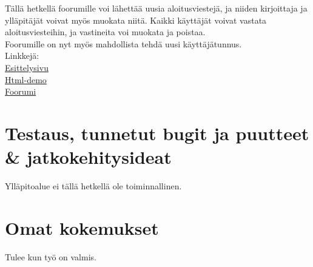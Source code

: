 \documentclass[12pt,a4paper,leqno]{report}
\begin{document}
\noindent Tällä hetkellä foorumille voi lähettää uusia aloitusviestejä, ja niiden kirjoittaja ja ylläpitäjät voivat myös muokata niitä. Kaikki käyttäjät voivat vastata aloitusviesteihin, ja vastineita voi muokata ja poistaa.\\

\noindent Foorumille on nyt myös mahdollista tehdä uusi käyttäjätunnus.\\

\noindent Linkkejä:\\
\href{http://wlehtoma.users.cs.helsinki.fi/Keskustelufoorumi/esittelysivu.html}{Esittelysivu}\\
\href{http://wlehtoma.users.cs.helsinki.fi/Keskustelufoorumi/html-demo/}{Html-demo}\\
\href{http://wlehtoma.users.cs.helsinki.fi/Keskustelufoorumi/kirjautuminen.php}{Foorumi}

\chapter{Testaus, tunnetut bugit ja puutteet \& jatkokehitysideat}

Ylläpitoalue ei tällä hetkellä ole toiminnallinen.

\chapter{Omat kokemukset}

Tulee kun työ on valmis.
\end{document}
